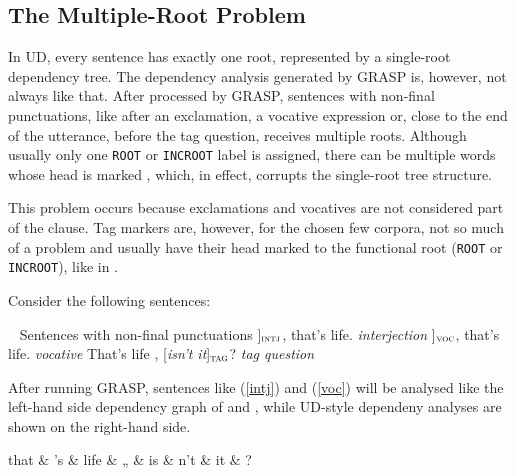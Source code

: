 \subsection{The Multiple-Root Problem}
In UD, every sentence has exactly one root, represented by a single-root dependency tree. The dependency analysis generated by GRASP is, however, not always like that. After processed by GRASP, sentences with non-final punctuations, like after an exclamation, a vocative expression or, close to the end of the utterance, before the tag question, receives multiple roots. Although usually only one \texttt{ROOT} or \texttt{INCROOT} label is assigned, there can be multiple words whose head is marked , which, in effect, corrupts the single-root tree structure.

This problem occurs because exclamations and vocatives are not considered part of the clause. Tag markers are, however, for the chosen few corpora, not so much of a problem and usually have their head marked to the functional root (\texttt{ROOT} or \texttt{INCROOT}), like in .

Consider the following sentences:

\pex~ Sentences with non-final punctuations\label{roots}
\a {[\sl Well\/}]$_{\text{\sc intj}}$, that's life.        \hfill {\sl interjection}\label{intj}
\a {[\sl  Son\/}]$_{\text{\sc voc}}$, that's life.         \hfill {\sl vocative}\label{voc}
\a That's life , {[\sl isn't it}]$_{\text{\sc tag}}$?    \hfill {\sl tag question}\label{tagq}
\xe


After running GRASP, sentences like (\ref{intj}) and (\ref{voc}) will be analysed like the left-hand side dependency graph of  and , while UD-style dependeny analyses are shown on the right-hand side.\\

\begin{minipage}{\widefigurewidth}
\begin{dependency}[edge slant=3pt]
	\begin{deptext}[column sep=1cm]
	that \& 's \& life \& „ \& is \& n't \& it \& ?\\
	\end{deptext}
\end{dependency}
\end{minipage}
\label{fig:taggr}


